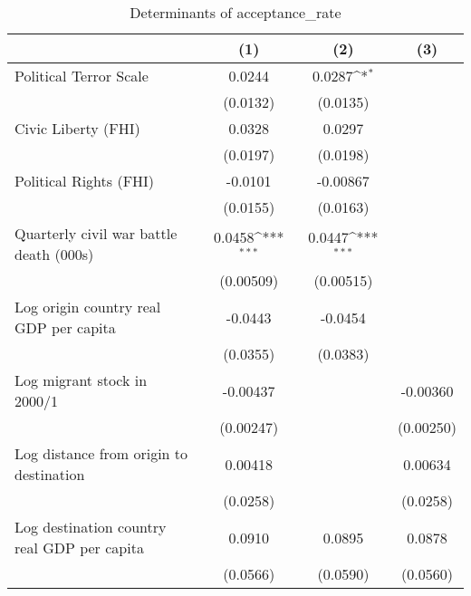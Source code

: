 \begin{table}[htbp]\centering
\def\sym#1{\ifmmode^{#1}\else\(^{#1}\)\fi}
\caption{Determinants of acceptance\_rate}
\begin{tabular}{l*{3}{c}}
\hline\hline
                    &\multicolumn{1}{c}{(1)}         &\multicolumn{1}{c}{(2)}         &\multicolumn{1}{c}{(3)}         \\
\hline
Political Terror Scale&      0.0244         &      0.0287\sym{*}  &                     \\
                    &    (0.0132)         &    (0.0135)         &                     \\
[1em]
Civic Liberty (FHI) &      0.0328         &      0.0297         &                     \\
                    &    (0.0197)         &    (0.0198)         &                     \\
[1em]
Political Rights (FHI)&     -0.0101         &    -0.00867         &                     \\
                    &    (0.0155)         &    (0.0163)         &                     \\
[1em]
Quarterly civil war battle death (000s)&      0.0458\sym{***}&      0.0447\sym{***}&                     \\
                    &   (0.00509)         &   (0.00515)         &                     \\
[1em]
Log origin country real GDP per capita&     -0.0443         &     -0.0454         &                     \\
                    &    (0.0355)         &    (0.0383)         &                     \\
[1em]
Log migrant stock in 2000/1&    -0.00437         &                     &    -0.00360         \\
                    &   (0.00247)         &                     &   (0.00250)         \\
[1em]
Log distance from origin to destination&     0.00418         &                     &     0.00634         \\
                    &    (0.0258)         &                     &    (0.0258)         \\
[1em]
Log destination country real GDP per capita&      0.0910         &      0.0895         &      0.0878         \\
                    &    (0.0566)         &    (0.0590)         &    (0.0560)         \\

\end{tabular}
\end{table}
